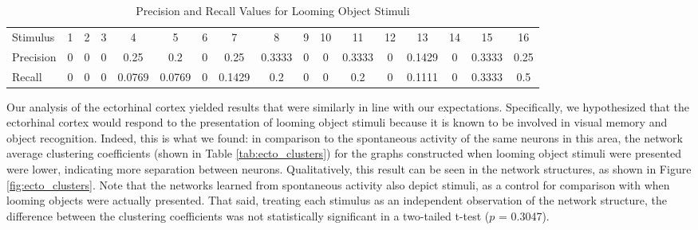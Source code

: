 \documentclass{article}
\begin{document}
\begin{table}[ht]
  \centering
  \footnotesize
  
  \begin{tabular}{l|c|c|c|c|c|c|c|c|c|c|c|c|c|c|c|c}
    \hline
    Stimulus  & 1 & 2 & 3 & 4      & 5      & 6 & 7      & 8      & 9 & 10 & 11     & 12 & 13     & 14 & 15     & 16   \\
    Precision & 0 & 0 & 0 & 0.25   & 0.2    & 0 & 0.25   & 0.3333 & 0 & 0  & 0.3333 & 0  & 0.1429 & 0  & 0.3333 & 0.25 \\
    Recall    & 0 & 0 & 0 & 0.0769 & 0.0769 & 0 & 0.1429 & 0.2    & 0 & 0  & 0.2    & 0  & 0.1111 & 0  & 0.3333 & 0.5  \\
    \hline 
  \end{tabular}

  \caption{Precision and Recall Values for Looming Object Stimuli}
  \label{tab:precision_recall}
\end{table}

Our analysis of the ectorhinal cortex yielded results that were similarly in 
line with our expectations. Specifically, we hypothesized that the ectorhinal 
cortex would respond to the presentation of looming object stimuli because it 
is known to be involved in visual memory and object recognition. Indeed, this 
is what we found: in comparison to the spontaneous activity of the same 
neurons in this area, the network average clustering coefficients (shown in 
Table \ref{tab:ecto_clusters}) for the graphs constructed when looming object 
stimuli were presented were lower, indicating more separation between neurons. 
Qualitatively, this result can be seen in the network structures, as shown in 
Figure \ref{fig:ecto_clusters}. Note that the networks learned from 
spontaneous activity also depict stimuli, as a control for comparison with 
when looming objects were actually presented. That said, treating each 
stimulus as an independent observation of the network structure, the 
difference between the clustering coefficients was not statistically 
significant in a two-tailed t-test ($p$ = 0.3047). \par
\end{document}
